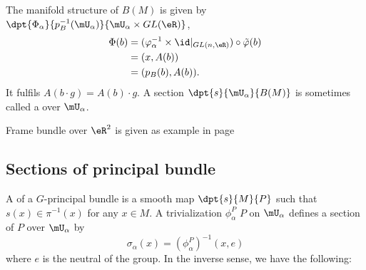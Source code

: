 The manifold structure of $B(M)$ is given by $\dpt{\Phi_{\alpha}}{p_B^{-1}(\mU_{\alpha})}{\mU_{\alpha}\times GL(\eR)}$,
\begin{equation}
	\begin{split}
		\Phi(b)&=(\varphi_{\alpha}^{-1}\times \id|_{GL(n,\eR)})\circ\tilde{\varphi}(b)\\
		&=(x,A(b))\\
		&=(p_B(b),A(b)).
	\end{split}
\end{equation}
It fulfils $A(b\cdot g)=A(b)\cdot g$. A section $\dpt{s}{\mU_{\alpha}}{B(M)}$ is sometimes called a  over $\mU_{\alpha}$.

Frame bundle over $\eR^2$ is given as example in page \pageref{Pg_exempleRdeux}
%
%
%
%
%
%
%

\subsection{Sections of principal bundle}

A  of a $G$-principal bundle is a smooth map $\dpt{s}{M}{P}$ such that $s(x)\in\pi^{-1}(x)$ for any $x\in M$. A trivialization $\phi_{\alpha}^P$ $P$ on $\mU_{\alpha}$ defines a section of $P$ over $\mU_{\alpha}$ by
\[
	\sigma_{\alpha}(x)=(\phi_{\alpha}^P)^{-1}(x,e)
\]
where $e$ is the neutral of the group. In the inverse sense, we have the following:

